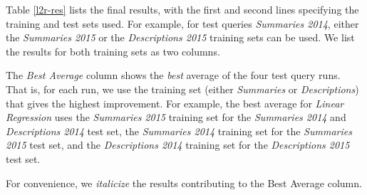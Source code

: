 Table \ref{l2r-res} lists the final results, with the first and second lines 
specifying the training and test sets used. For example, for test queries \emph{Summaries 2014},
either the \emph{Summaries 2015} or the \emph{Descriptions 2015} training sets can be used. 
We list the results for both training sets as two columns.

The \emph{Best Average} column shows the \emph{best} average of the four test query runs.
That is, for each run, we use the training set (either \emph{Summaries} or \emph{Descriptions}) that gives the highest
improvement. For example, the best average for \emph{Linear Regression} uses the \emph{Summaries 2015} training set for the
\emph{Summaries 2014} and \emph{Descriptions 2014} test set, 
the \emph{Summaries 2014} training set for the \emph{Summaries 2015} test set, and 
the \emph{Descriptions 2014} training set for the \emph{Descriptions 2015} test set.

For convenience, we \textit{italicize} the results contributing to the Best Average column.

